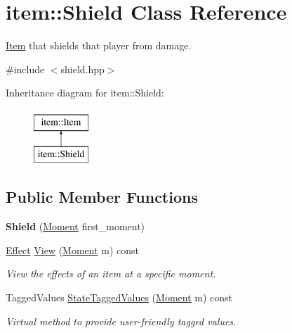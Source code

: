 \hypertarget{classitem_1_1_shield}{}\section{item\+:\+:Shield Class Reference}
\label{classitem_1_1_shield}


\hyperlink{classitem_1_1_item}{Item} that shields that player from damage.  




{\ttfamily \#include $<$shield.\+hpp$>$}

Inheritance diagram for item\+:\+:Shield\+:\begin{figure}[H]
\begin{center}
\leavevmode
\includegraphics[height=2.000000cm]{classitem_1_1_shield}
\end{center}
\end{figure}
\subsection*{Public Member Functions}
\begin{DoxyCompactItemize}
\item 
\mbox{\label{classitem_1_1_shield_ac65eef60e78829da35895968923fb3b7}} 
{\bfseries Shield} (\hyperlink{classtimeplane_1_1_moment}{Moment} first\+\_\+moment)
\item 
\hyperlink{classitem_1_1_effect}{Effect} \hyperlink{classitem_1_1_shield_ae4a97ec6084467b7c87c91fdabcd9e94}{View} (\hyperlink{classtimeplane_1_1_moment}{Moment} m) const
\begin{DoxyCompactList}\small\item\em View the effects of an item at a specific moment. \end{DoxyCompactList}\item 
Tagged\+Values \hyperlink{classitem_1_1_shield_a1a246374ed47a4d9849bad97091c42cb}{State\+Tagged\+Values} (\hyperlink{classtimeplane_1_1_moment}{Moment} m) const
\begin{DoxyCompactList}\small\item\em Virtual method to provide user-\/friendly tagged values. \end{DoxyCompactList}\end{DoxyCompactItemize}
